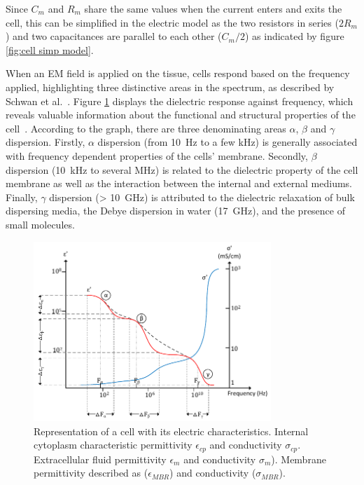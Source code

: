 Since $C_m$ and $R_m$ share the same values when the current enters and exits the cell, this can be simplified in the electric model as the two resistors in series ($2R_m$) and two capacitances are parallel to each other ($C_m/2$) as indicated by figure \ref{fig:cell simp model}.

When an EM field is applied on the tissue, cells respond based on the frequency applied, highlighting three distinctive areas in the spectrum, as described by Schwan et al.~\cite{schwan1957electrical,schwan1962electrical}. Figure \ref{fig:ABG dispersion} displays the dielectric response against frequency, which reveals valuable information about the functional and structural properties of the cell~\cite{lvovich2012impedance}. According to the graph, there are three denominating areas $\alpha$, $\beta$ and $\gamma$ dispersion. Firstly, $\alpha$ dispersion (from \SI{10}{\hertz} to a few \si{\kilo\hertz}) is generally associated with frequency dependent properties of the cells' membrane. Secondly, $\beta$ dispersion (\SI{10}{\kilo\hertz} to several \si{\mega\hertz}) is related to the dielectric property of the cell membrane as well as the interaction between the internal and external mediums. Finally, $\gamma$ dispersion (> \SI{10}{\giga\hertz}) is attributed to the dielectric relaxation of bulk dispersing media, the Debye dispersion in water (\SI{17}{\giga\hertz}), and the presence of small molecules. 

\begin{figure}[!htpb]
	\centering
	\includegraphics[width=0.8\textwidth,keepaspectratio, trim={0cm 1cm 0cm 0cm},clip]{figure3}    
	\caption[Alpha, Bet y Gama dispersion]{Representation of a cell with its electric characteristics. Internal cytoplasm characteristic permittivity $\epsilon_{cp}$ and conductivity $\sigma_{cp}$. Extracellular fluid permittivity $\epsilon_m$ and conductivity $\sigma_m$). Membrane permittivity described as ($\epsilon_{MBR}$) and conductivity ($\sigma_{MBR}$).}
	\label{fig:ABG dispersion}
\end{figure}

